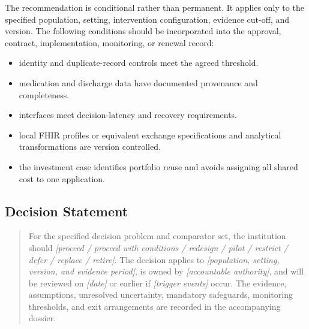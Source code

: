 The recommendation is conditional rather than permanent. It applies only to the
specified population, setting, intervention configuration, evidence cut-off, and
version. The following conditions should be incorporated into the approval,
contract, implementation, monitoring, or renewal record:

\begin{itemize}
 \item identity and duplicate-record controls meet the agreed threshold.
 \item medication and discharge data have documented provenance and completeness.
 \item interfaces meet decision-latency and recovery requirements.
 \item local FHIR profiles or equivalent exchange specifications and analytical transformations are version controlled.
 \item the investment case identifies portfolio reuse and avoids assigning all shared cost to one application.
\end{itemize}

\subsection{Decision Statement}
\begin{quote}
For the specified decision problem and comparator set, the institution should
\emph{[proceed / proceed with conditions / redesign / pilot / restrict / defer /
replace / retire]}. The decision applies to \emph{[population, setting, version,
and evidence period]}, is owned by \emph{[accountable authority]}, and will be
reviewed on \emph{[date]} or earlier if \emph{[trigger events]} occur. The
evidence, assumptions, unresolved uncertainty, mandatory safeguards, monitoring
thresholds, and exit arrangements are recorded in the accompanying dossier.
\end{quote}

